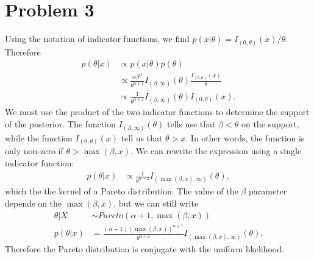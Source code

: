 \documentclass[a4paper,10pt]{article}
\begin{document}
\section{Problem 3}
Using the notation of indicator functions, we find $p(x|\theta) = I_{(0,\theta)}(x)/\theta$.  Therefore
\begin{align*}
p(\theta|x) &\propto p(x|\theta)p(\theta) \\
&\propto \frac{\alpha\beta^{\alpha}}{\theta^{\alpha+1}}I_{(\beta,\infty)}(\theta)\frac{I_{(0,\theta)}(x)}{\theta} \\
& \propto \frac{1}{\theta^{\alpha+2}}I_{(\beta,\infty)}(\theta)I_{(0,\theta)}(x).
\end{align*}
We must use the product of the two indicator functions to determine the support of the posterior. The function $I_{(\beta,\infty)}(\theta)$ tells use that $\beta < \theta$ on the support, while the function $I_{(0,\theta)}(x)$ tell us that $\theta > x$.  In other words, the function is only non-zero if $\theta > \max(\beta, x)$.  We can rewrite the expression using a single indicator function:
\begin{align*}
p(\theta|x) &\propto \frac{1}{\theta^{\alpha+2}}I_{(\max(\beta, x),\infty)}(\theta),
\end{align*}
which the the kernel of a Pareto distribution.  The value of the $\beta$ parameter depends on the $\max(\beta,x)$, but we can still write
\begin{align*}
\theta|X &\sim Pareto(\alpha+1, \max(\beta, x)) \\
p(\theta | x) &= \frac{(\alpha+1)(\max(\beta, x))^{\alpha+1}}{\theta^{\alpha+2}}I_{(\max(\beta, x),\infty)}(\theta).
\end{align*}
Therefore the Pareto distribution is conjugate with the uniform likelihood.  
\end{document}
